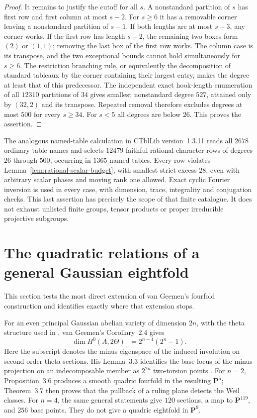 \documentclass[11pt]{article}
\theoremstyle{definition}
\theoremstyle{remark}
\begin{document}
\begin{proof}
It remains to justify the cutoff for all $s$.  A nonstandard
partition of $s$ has first row and first column at most $s-2$.
For $s\ge6$ it has a removable corner leaving a nonstandard
partition of $s-1$.  If both lengths are at most $s-3$, any
corner works.  If the first row has length $s-2$, the remaining
two boxes form $(2)$ or $(1,1)$; removing the last box of the
first row works.  The column case is its transpose, and the two
exceptional bounds cannot hold simultaneously for $s\ge6$.
The restriction branching rule, or equivalently the decomposition
of standard tableaux by the corner containing their largest entry,
makes the degree at least that of this predecessor.
The independent exact hook-length enumeration of all $12310$
partitions of $34$ gives smallest nonstandard degree $527$,
attained only by $(32,2)$ and its transpose.  Repeated removal
therefore excludes degrees at most $500$ for every $s\ge34$.
For $s<5$ all degrees are below $26$.  This proves the assertion.
\end{proof}

The analogous named-table calculation in CTblLib version~1.3.11
reads all $2678$ ordinary table names and selects $12479$ faithful
rational-character rows of degrees $26$ through $500$, occurring
in $1365$ named tables.  Every row violates
Lemma~\ref{lem:rational-scalar-budget}, with smallest strict
excess $28$, even with arbitrary scalar phases and moving rank
one allowed.  Exact cyclic Fourier inversion is used in every
case, with dimension, trace, integrality and conjugation checks.
This last assertion has precisely the scope of that finite
catalogue.  It does not exhaust unlisted finite groups, tensor
products or proper irreducible projective subgroups.
\section{The quadratic relations of a general Gaussian eightfold}
\label{sec:theta-eightfolds}
This section tests the most direct extension of van Geemen's fourfold construction and identifies exactly where that extension stops.

For an even principal Gaussian abelian variety of dimension $2n$,
with the theta structure used in \cite{vG96}, van Geemen's
Corollary~2.4 gives
\[
 \dim H^0(A,2\Theta)_-=2^{n-1}(2^n-1).
\]
Here the subscript denotes the minus eigenspace of the induced
involution on second-order theta sections.
His Lemma~3.3 identifies the base locus of the minus projection on an indecomposable member as $2^{2n}$ two-torsion points \cite[pp.~621--622]{vG96}. For $n=2$, Proposition~3.6 produces a smooth quadric fourfold in the resulting $\mathbf P^5$; Theorem~3.7 then proves that the pullback of a ruling plane detects the Weil classes. For $n=4$, the same general statements give $120$ sections, a map to $\mathbf P^{119}$, and $256$ base points. They do not give a quadric eightfold in $\mathbf P^9$.
\end{document}
